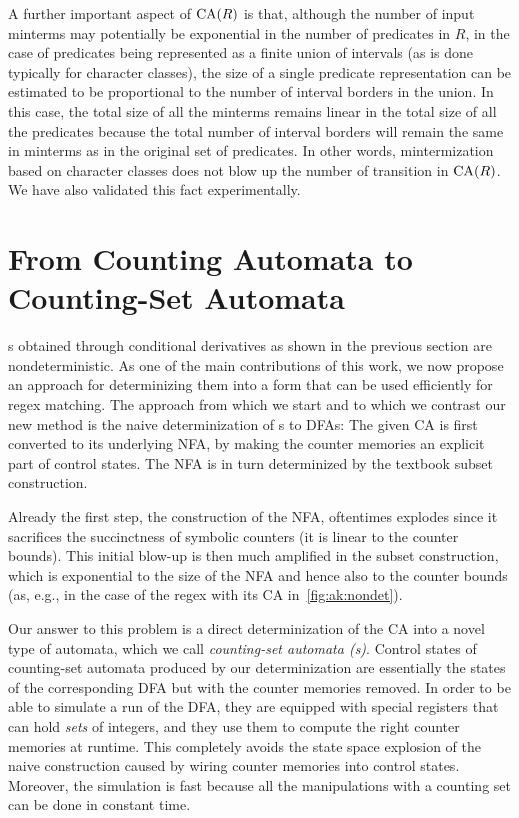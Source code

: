\documentclass[acmsmall,screen]{acmart}
\begin{document}
A further important aspect of $\textrm{CA}(R)$ is that,
although the number of input minterms may potentially be exponential
in the number of predicates in $R$, in the case of predicates being
represented as a finite union of intervals (as is done typically for
character classes), the size of a single predicate representation can
be estimated to be proportional to the number of interval borders in
the union.  In this case, the total size of all the minterms remains
linear in the total size of all the predicates because the total
number of interval borders will remain the same in minterms as in the
original set of predicates.  In other words, mintermization based on
character classes does not blow up the number of transition in
$\textrm{CA}(R)$. We have also validated this fact experimentally.

\section{From Counting Automata to Counting-Set Automata} \label{sec:algo-idea}

{\CA}s obtained through conditional derivatives as shown in the previous section
are nondeterministic.
%
As one of the main contributions of this work, we now propose an approach for
determinizing them into a form that can be used efficiently for regex matching. 
%
The approach from which we start and to which we contrast our new method is the
naive determinization of {\CA}s to DFAs:
%
The given CA is first converted to its underlying NFA, by making the counter
memories an explicit part of control states.
%
The NFA is in turn determinized by the textbook subset construction. 

Already the first step, the construction of the NFA, oftentimes explodes since
it sacrifices the succinctness of symbolic counters (it is linear to the counter
bounds).
%
This initial blow-up is then much amplified in the subset construction, which is
exponential to the size of the NFA and hence also to the counter bounds (as,
e.g., in the case of the regex  with its CA
in~\cref{fig:ak:nondet}).

Our answer to this problem is a direct determinization of the CA into a novel type
of automata, which we call \emph{counting-set automata ({\CSA}s)}.
%
Control states of counting-set automata produced by our determinization are
essentially the states of the corresponding DFA but with the counter memories
removed.
%
In order to be able to simulate a run of the DFA, they  are equipped with
special registers that can hold \emph{sets} of integers, and they use them to
compute the right counter memories at runtime.
%
This completely avoids the state space explosion of the naive construction
caused by wiring counter memories into control states.
%
Moreover, the simulation is fast because all the manipulations with a
counting set can be done in constant time. 
\end{document}
